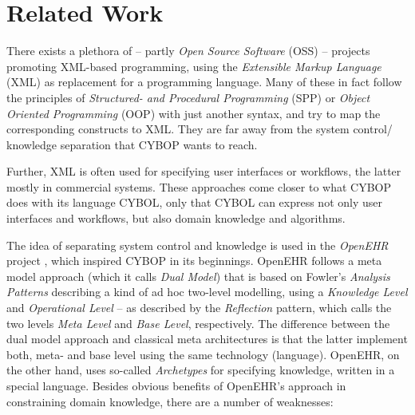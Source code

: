 %
%
%
%
%
%
%

\section{Related Work}
\label{related_work_heading}

There exists a plethora of -- partly \emph{Open Source Software} (OSS) -- projects
promoting XML-based programming, using the \emph{Extensible Markup Language}
(XML) as replacement for a programming language. Many of these in fact follow
the principles of \emph{Structured- and Procedural Programming} (SPP) or
\emph{Object Oriented Programming} (OOP) with just another syntax, and try to
map the corresponding constructs to XML. They are far away from the system
control/ knowledge separation that CYBOP wants to reach.

Further, XML is often used for specifying user interfaces or workflows, the
latter mostly in commercial systems. These approaches come closer to what CYBOP
does with its language CYBOL, only that CYBOL can express not only user
interfaces and workflows, but also domain knowledge and algorithms.

The idea of separating system control and knowledge is used in the \emph{OpenEHR}
project \cite{openehr}, which inspired CYBOP in its beginnings. OpenEHR follows
a meta model approach (which it calls \emph{Dual Model}) that is based on
Fowler's \emph{Analysis Patterns} \cite{fowler1997} describing a kind of ad hoc
two-level modelling, using a \emph{Knowledge Level} and \emph{Operational Level}
-- as described by the \emph{Reflection} pattern, which calls the two levels
\emph{Meta Level} and \emph{Base Level}, respectively. The difference between
the dual model approach and classical meta architectures is that the latter
implement both, meta- and base level using the same technology (language).
OpenEHR, on the other hand, uses so-called \emph{Archetypes} for specifying
knowledge, written in a special language. Besides obvious benefits of OpenEHR's
approach in constraining domain knowledge, there are a number of weaknesses:


